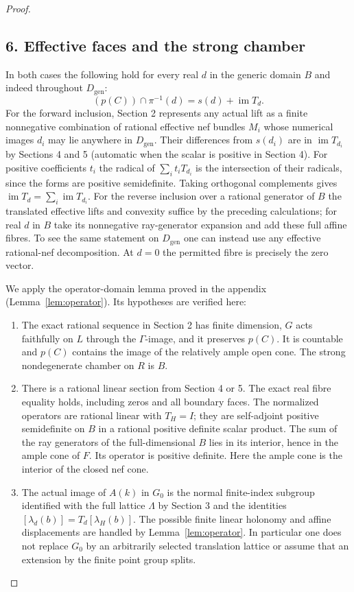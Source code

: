 \documentclass[11pt]{article}
\providecommand{\tightlist}{\setlength{\itemsep}{0pt}\setlength{\parskip}{0pt}}
\begin{document}
\begin{proof}
\subsection*{6. Effective faces and the strong chamber}

In both cases the following hold for every real \(d\) in the generic domain \(B\) and indeed throughout \(D_{\mathrm{gen}}\): \[
 (p(C))\cap\pi^{-1}(d)=s(d)+\operatorname{im}T_d .
\] For the forward inclusion, Section 2 represents any actual lift as a finite nonnegative combination of rational effective nef bundles \(M_i\) whose numerical images \(d_i\) may lie anywhere in \(D_{\mathrm{gen}}\). Their differences from \(s(d_i)\) are in \(\operatorname{im}T_{d_i}\) by Sections 4 and 5 (automatic when the scalar is positive in Section 4). For positive coefficients \(t_i\) the radical of \(\sum_i t_iT_{d_i}\) is the intersection of their radicals, since the forms are positive semidefinite. Taking orthogonal complements gives \(\operatorname{im}T_d=\sum_i\operatorname{im}T_{d_i}\). For the reverse inclusion over a rational generator of \(B\) the translated effective lifts and convexity suffice by the preceding calculations; for real \(d\) in \(B\) take its nonnegative ray-generator expansion and add these full affine fibres. To see the same statement on \(D_{\mathrm{gen}}\) one can instead use any effective rational-nef decomposition. At \(d=0\) the permitted fibre is precisely the zero vector.

We apply the operator-domain lemma proved in the appendix (Lemma~\ref{lem:operator}). Its hypotheses are
verified here:

\begin{enumerate}
\def\labelenumi{\arabic{enumi}.}
\tightlist
\item
  The exact rational sequence in Section 2 has finite dimension, \(G\) acts faithfully on \(L\) through the \(\Gamma\)-image, and it preserves \(p(C)\). It is countable and \(p(C)\) contains the image of the relatively ample open cone. The strong nondegenerate chamber on \(R\) is \(B\).
\item
  There is a rational linear section from Section 4 or 5. The exact real fibre equality holds, including zeros and all boundary faces. The normalized operators are rational linear with \(T_H=I\); they are self-adjoint positive semidefinite on \(B\) in a rational positive definite scalar product. The sum of the ray generators of the full-dimensional \(B\) lies in its interior, hence in the ample cone of \(F\). Its operator is positive definite. Here the ample cone is the interior of the closed nef cone.
\item
  The actual image of \(A(k)\) in \(G_0\) is the normal finite-index subgroup identified with the full lattice \(\Lambda\) by Section 3 and the identities \([\lambda_d(b)]=T_d[\lambda_H(b)]\). The possible finite linear holonomy and affine displacements are handled by Lemma~\ref{lem:operator}. In particular one does not replace \(G_0\) by an arbitrarily selected translation lattice or assume that an extension by the finite point group splits.
\end{enumerate}


\end{proof}
\end{document}
